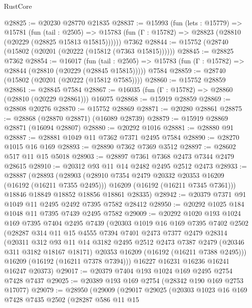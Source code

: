 \begin{lexlean}{RustCore}
\begin{coremodule}
@28825 := @20230 @28770 @21835
@28837 := @15993
    (fun (lets : @15779) =>
    @15781
      (fun (tail : @2505) =>
      @15783 (fun (Γ : @15782) => @28823 (@28810 (@20229 (@28825 @15813 @15815))))))
    @7362
@28844 := @15752 (@28740 (@15802 (@20201 (@20222 (@15812 (@7363 @15815))))))
@28845 := @28825 @7362
@28854 := @16017
    (fun (tail : @2505) => @15783 (fun (Γ : @15782) => @28844 (@28810 (@20229 (@28845 @15815)))))
    @7584
@28859 := @28740 (@15802 (@20201 (@20222 (@15812 @7585))))
@28860 := @15752 @28859
@28861 := @28845 @7584
@28867 := @16035 (fun (Γ : @15782) => @28860 (@28810 (@20229 @28861))) @16075
@28868 := @15919 @28859
@28869 := @28808 @20276
@28870 := @15752 @28869
@28871 := @20280 @28861
@28875 := @28868 (@28870 @28871) (@16089 @28739)
@28879 := @15919 @28869 @28871 (@16094 @28807)
@28880 := @20292 @1016
@28881 := @28880 @91
@28887 := @28881 @1049 @11 @7362 @7371 @2495 @7584
@28890 := @28270 @1015 @16 @169
@28893 := @28890 @7362 @7369 @3512
@28897 := @28602 @517 @11 @15 @5018
@28903 := @28897 @7361 @7368 @2473 @7344 @2479 @28615
@28910 := @20312 @93 @11 @14 @2482 @2495 @2512 @2473
@28933 := @28887
    (@28893
      (@28903
        (@28910 @7354 @2479 @20332 @20353 @16209 (@16192 (@16211 @7355 @2495)))
        @16209
        (@16192 (@16211 @7345 @7361)))
      @18846
      @18849
      @18852
      @18856
      @18861
      @28335)
@28942 := @20379 @7371 @91 @1049 @11 @2495 @2492 @7395 @7582 @28412
@28950 := @20292 @1025 @184 @1048 @11 @7395 @7439 @2495 @7582
@29009 := @20292
    @1020
    @193
    @1024
    @169
    @7395
    @7404
    @2495
    @7439
    (@20303
      @1019
      @16
      @169
      @7395
      @7402
      @2502
      (@28287
        @314
        @11
        @15
        @4555
        @7394
        @7401
        @2473
        @7377
        @2479
        @28314
        (@20311
          @312
          @93
          @11
          @14
          @3182
          @2495
          @2512
          @2473
          @7387
          @2479
          (@20346 @311 @3182 @18167 @18171)
          @20353
          @16209
          (@16192 (@16211 @7388 @2495)))
        @16209
        (@16192 (@16211 @7378 @7394)))
      @16227
      @16231
      @16236
      @16241
      @16247
      @20373)
@29017 := @20379 @7404 @193 @1024 @169 @2495 @2754 @7428 @7437
@29025 := @20389 @193 @169 @2754 (@28342 @190 @169 @2753 @17077)
@29079 := @28950
    (@29009
      (@29017
        @29025
        (@20303
          @1023
          @16
          @169
          @7428
          @7435
          @2502
          (@28287
            @586
            @11
            @15

\end{coremodule}
\end{lexlean}

